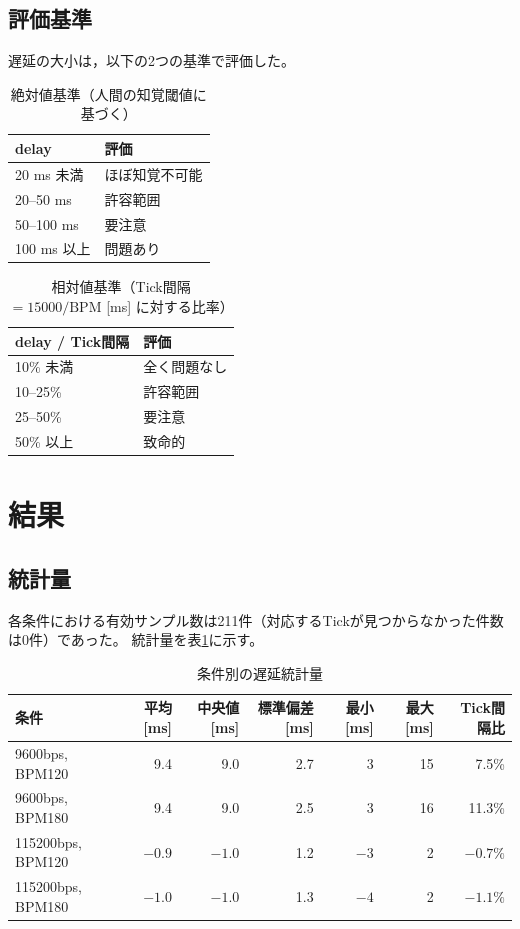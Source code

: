 \documentclass[11pt,a4paper]{ltjsarticle}
\begin{document}
\subsection{評価基準}
遅延の大小は，以下の2つの基準で評価した。

\begin{table}[h]
\centering
\caption{絶対値基準（人間の知覚閾値に基づく）}
\begin{tabular}{ll}
\toprule
delay & 評価 \\
\midrule
20 ms 未満 & ほぼ知覚不可能 \\
20--50 ms & 許容範囲 \\
50--100 ms & 要注意 \\
100 ms 以上 & 問題あり \\
\bottomrule
\end{tabular}
\end{table}

\begin{table}[h]
\centering
\caption{相対値基準（Tick間隔 $=15000/\mathrm{BPM}$ [ms] に対する比率）}
\begin{tabular}{ll}
\toprule
delay / Tick間隔 & 評価 \\
\midrule
10\% 未満 & 全く問題なし \\
10--25\% & 許容範囲 \\
25--50\% & 要注意 \\
50\% 以上 & 致命的 \\
\bottomrule
\end{tabular}
\end{table}

\section{結果}

\subsection{統計量}
各条件における有効サンプル数は211件（対応するTickが見つからなかった件数は0件）であった。
統計量を表\ref{tab:stats}に示す。

\begin{table}[h]
\centering
\caption{条件別の遅延統計量}
\label{tab:stats}
\begin{tabular}{lrrrrrr}
\toprule
条件 & 平均 [ms] & 中央値 [ms] & 標準偏差 [ms] & 最小 [ms] & 最大 [ms] & Tick間隔比 \\
\midrule
9600bps, BPM120   &  9.4 &  9.0 & 2.7 &  3 & 15 &  7.5\% \\
9600bps, BPM180   &  9.4 &  9.0 & 2.5 &  3 & 16 & 11.3\% \\
115200bps, BPM120 & $-0.9$ & $-1.0$ & 1.2 & $-3$ & 2 & $-0.7\%$ \\
115200bps, BPM180 & $-1.0$ & $-1.0$ & 1.3 & $-4$ & 2 & $-1.1\%$ \\
\bottomrule
\end{tabular}
\end{table}
\end{document}
